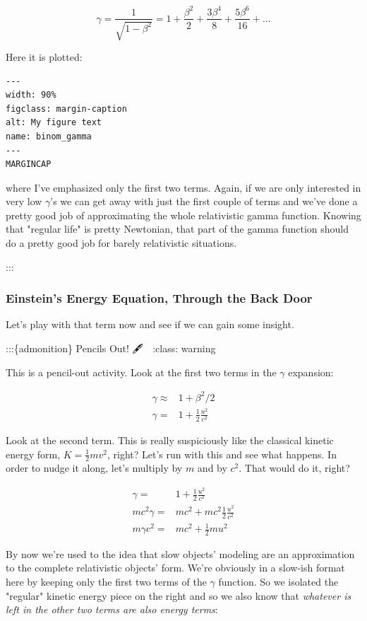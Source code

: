 \documentclass[
]{article}
\begin{document}
\[\gamma = \frac{1}{\sqrt{1-\beta^2}} = 1+\frac{\beta^2}{2}+\frac{3\beta^4}{8}+\frac{5\beta^6}{16}+...\]

Here it is plotted:

\begin{verbatim}
---
width: 90%
figclass: margin-caption
alt: My figure text
name: binom_gamma
---
MARGINCAP
\end{verbatim}

where I've emphasized only the first two terms. Again, if we are only
interested in very low \(\gamma\)'s we can get away with just the first
couple of terms and we've done a pretty good job of approximating the
whole relativistic gamma function. Knowing that "regular life" is pretty
Newtonian, that part of the gamma function should do a pretty good job
for barely relativistic situations.

:::

\hypertarget{einsteins-energy-equation-through-the-back-door}{%
\subsubsection{Einstein's Energy Equation, Through the Back
Door}\label{einsteins-energy-equation-through-the-back-door}}

Let's play with that term now and see if we can gain some insight.

:::\{admonition\} Pencils Out! 🖋 📓 :class: warning

This is a pencil-out activity. Look at the first two terms in the
\(\gamma\) expansion:

\begin{align*}
\gamma \approx& 1 + \beta^2/2 \\
\gamma =& 1 + \frac{1}{2}\frac{u^2}{c^2}
\end{align*}

Look at the second term. This is really suspiciously like the classical
kinetic energy form, \(K=\frac{1}{2}mv^2\), right? Let's run with this
and see what happens. In order to nudge it along, let's multiply by
\(m\) and by \(c^2\). That would do it, right?

\begin{align*}
\gamma =& 1+\frac{1}{2}\frac{u^2}{c^2} \\
mc^2\gamma =& mc^2 + mc^2\frac{1}{2}\frac{u^2}{c^2} \\
m\gamma c^2 =& mc^2 + \frac{1}{2}mu^2
\end{align*}

By now we're used to the idea that slow objects' modeling are an
approximation to the complete relativistic objects' form. We're
obviously in a slow-ish format here by keeping only the first two terms
of the \(\gamma\) function. So we isolated the "regular" kinetic energy
piece on the right and so we also know that \emph{whatever is left in
the other two terms are also energy terms}:
\end{document}
